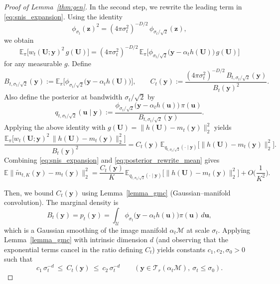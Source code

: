 \documentclass[12pt]{article}
\theoremstyle{definition} %
\newcommand{\y}{\bm y}
\providecommand{\E}{\mathbb{E}}
\begin{document}
\begin{proof}[Proof of Lemma~\ref{thm:gen}]
In the second step, we rewrite the leading term in \eqref{eq:snis_expansion}.
Using the identity
\[
\phi_{\sigma_t}(\bm z)^2
=
(4\pi\sigma_t^2)^{-D/2}\,
\phi_{\sigma_t/\sqrt 2}(\bm z),
\]
we obtain
\[
\E_\pi\!\big[w_t(\bm U;\y)^2\,g(\bm U)\big]
=
(4\pi\sigma_t^2)^{-D/2}\,
\E_\pi\!\Big[\phi_{\sigma_t/\sqrt 2}\!\big(\y-\alpha_t h(\bm U)\big)\,g(\bm U)\Big]
\]
for any measurable $g$.
Define
\[
B_{t,\sigma_t/\sqrt2}(\y)
:=
\E_\pi\!\Big[\phi_{\sigma_t/\sqrt 2}\!\big(\y-\alpha_t h(\bm U)\big)\Big],
\qquad
C_t(\y)
:=
\frac{(4\pi\sigma_t^2)^{-D/2}\,B_{t,\sigma_t/\sqrt2}(\y)}{B_t(\y)^2}.
\]
Also define the posterior at bandwidth $\sigma_t/\sqrt2$ by
\[
q_{t,\sigma_t/\sqrt2}(\bm u\mid \y)
:=
\frac{\phi_{\sigma_t/\sqrt2}\!\big(\y-\alpha_t h(\bm u)\big)\,\pi(\bm u)}
{B_{t,\sigma_t/\sqrt2}(\y)}.
\]
Applying the above identity with $g(\bm U)=\|h(\bm U)-m_t(\y)\|_2^2$ yields
\begin{equation}\label{eq:posterior_rewrite_mean}
\frac{\E_\pi\!\big[w_t(\bm U;\y)^2\,\|h(\bm U)-m_t(\y)\|_2^2\big]}{B_t(\y)^2}
=
C_t(\y)\,
\E_{q_{t,\sigma_t/\sqrt2}(\cdot\mid \y)}\!\big[\|h(\bm U)-m_t(\y)\|_2^2\big].
\end{equation}
Combining \eqref{eq:snis_expansion} and \eqref{eq:posterior_rewrite_mean} gives
\begin{equation}\label{eq:pointwise_mean_mse}
\E\big\|\widetilde m_{t,K}(\y)-m_t(\y)\big\|_2^2
=
\frac{C_t(\y)}{K}\,
\E_{q_{t,\sigma_t/\sqrt2}(\cdot\mid \y)}\!\big[\|h(\bm U)-m_t(\y)\|_2^2\big]
+O\!\Big(\frac{1}{K^2}\Big).
\end{equation}

Then, we bound $C_t(\y)$ using Lemma~\ref{lemma_gmc} (Gaussian--manifold convolution).
The marginal density is
\[
B_t(\y)=p_t(\y)=\int_{\mathcal U}\phi_{\sigma_t}\!\big(\y-\alpha_t h(\bm u)\big)\pi(\bm u)\,d\bm u,
\]
which is a Gaussian smoothing of the image manifold $\alpha_t\mathcal M$ at scale $\sigma_t$.
Applying Lemma~\ref{lemma_gmc} with intrinsic dimension $d$ (and observing that the exponential
terms cancel in the ratio defining $C_t$) yields constants $c_1,c_2,\sigma_0>0$ such that
\begin{equation}\label{eq:Ct_bounds}
c_1\,\sigma_t^{-d}\ \le\ C_t(\y)\ \le\ c_2\,\sigma_t^{-d}
\qquad(\y\in\mathcal T_r(\alpha_t\mathcal M),\ \sigma_t\le \sigma_0).
\end{equation}


\end{proof}
\end{document}
